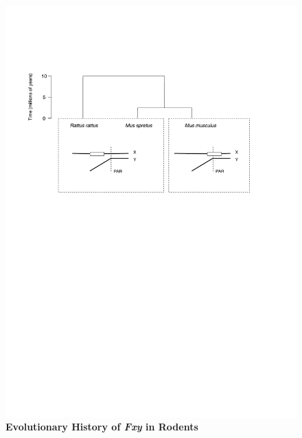 \begin{figure}[!ht]
\centering
\includegraphics[width=\textwidth]{figures/diagrams/Fxy.pdf}
\caption{\textbf{Evolutionary History of \textit{Fxy} in Rodents}}
\label{fig:Fxy}
\end{figure}